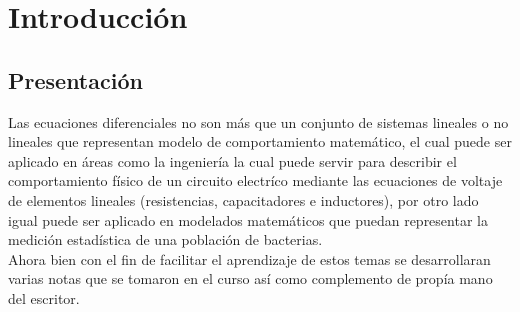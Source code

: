 \documentclass[10pt]{article}
\begin{document}
\begin{center}
	\par{}
	\par{}
	\par{}
	\par\vspace{2cm}{
		Ultima fecha modificado: \today
	}
\end{center}

\clearpage
\tableofcontents
\clearpage

\section{Introducción}
\subsection{Presentación}
Las ecuaciones diferenciales no son más que un conjunto de sistemas lineales o no lineales que representan modelo de comportamiento matemático, el cual puede ser aplicado en áreas como la ingeniería la cual puede servir para describir el comportamiento físico de un circuito electríco mediante las ecuaciones de voltaje de elementos lineales (resistencias, capacitadores e inductores), por otro lado igual puede ser aplicado en modelados matemáticos que puedan representar la medición estadística de una población de bacterias.\\
Ahora bien con el fin de facilitar el aprendizaje de estos temas se desarrollaran varias notas que se tomaron en el curso así como complemento de propía mano del escritor.
\end{document}
